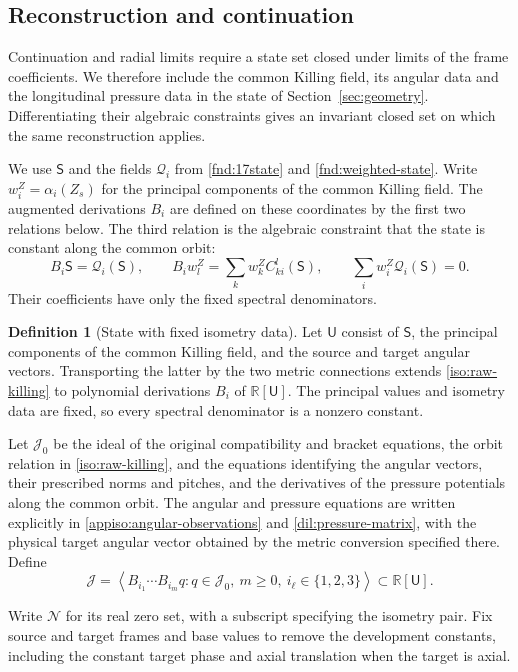 \documentclass[11pt,a4paper]{article}
\numberwithin{equation}{section}
\theoremstyle{plain}
\theoremstyle{definition}
\newtheorem{definition}[theorem]{Definition}
\theoremstyle{remark}
\begin{document}
\subsection{Reconstruction and continuation}

Continuation and radial limits require a state set closed under
limits of the frame coefficients. We therefore include the common
Killing field, its angular data and the longitudinal pressure data in
the state of Section~\ref{sec:geometry}. Differentiating their algebraic
constraints gives an invariant closed set on which the same
reconstruction applies.

We use $\mathsf S$ and the fields $\mathcal Q_i$ from
\eqref{fnd:17state} and \eqref{fnd:weighted-state}.
Write $w_i^Z=\alpha_i(Z_s)$ for the principal components of the common
Killing field. The augmented derivations $B_i$ are defined on these
coordinates by the first two relations below. The third relation
is the algebraic constraint that the state is constant along the common orbit:
\begin{equation}\label{iso:raw-killing}
 B_i\mathsf S=\mathcal Q_i(\mathsf S),\qquad B_iw_l^Z=\sum_k w_k^ZC^l_{ki}(\mathsf S),\qquad
 \sum_i w_i^Z\mathcal Q_i(\mathsf S)=0.
\end{equation}
Their coefficients have only the fixed spectral denominators.

\begin{definition}[State with fixed isometry data]\label{iso:complete-state}
Let $\mathsf U$ consist of $\mathsf S$, the principal components of the
common Killing field, and the source and target angular vectors.
Transporting the latter by the two metric connections extends
\eqref{iso:raw-killing} to polynomial derivations $B_i$ of
$\mathbb R[\mathsf U]$. The principal values and isometry data
are fixed, so every spectral denominator is a nonzero constant.

Let $\mathscr J_0$ be the ideal of the original compatibility and bracket
equations, the orbit relation in \eqref{iso:raw-killing}, and the equations
identifying the angular vectors, their prescribed norms and pitches,
and the derivatives of the pressure potentials along the common orbit.
The angular and pressure equations are written explicitly in
\eqref{appiso:angular-observations} and \eqref{dil:pressure-matrix},
with the physical target angular vector obtained by the metric
conversion specified there.
Define
\begin{equation}\label{iso:differential-ideal}
 \mathscr J=\left\langle
 B_{i_1}\cdots B_{i_m}q:
 q\in\mathscr J_0,\ m\ge0,\ i_\ell\in\{1,2,3\}
 \right\rangle\subset\mathbb R[\mathsf U].
\end{equation}

Write $\mathscr N$ for its real zero set, with a subscript specifying
the isometry pair. Fix source and target frames and base values to
remove the development constants, including the constant target phase
and axial translation when the target is axial.
\end{definition}
\end{document}
